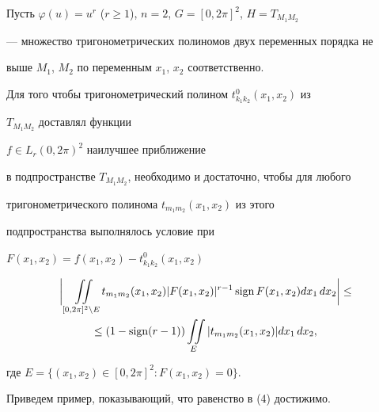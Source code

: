 \begin{note} 


Пусть $\varphi(u)=u^r$ ($r\ge1$), $n=2$, $G=[0,2\pi]^2$, $H=T_{M_1M_2}$ 


--- множество тригонометрических полиномов двух переменных порядка не 


выше $M_1$, $M_2$ по переменным $x_1$, $x_2$ соответственно. 


 


Для того чтобы тригонометрический полином $t^0_{k_1k_2}(x_1,x_2)$ из 


$T_{M_1M_2}$ доставлял функции\linebreak


$f\in L_r(0,2\pi)^2$ наилучшее приближение 


в подпространстве $T_{M_1M_2}$, необходимо и достаточно, чтобы для любого 


тригонометрического полинома $t_{m_1m_2}(x_1,x_2)$ из этого 


подпространства выполнялось условие при 


$F(x_1,x_2)=f(x_1,x_2)-t^0_{k_1k_2}(x_1,x_2)$ 


\begin{multline*} 


\bigg|\;\iint\limits_{[0,2\pi]^2\setminus E}t_{m_1m_2}(x_1,x_2) 


|F(x_1,x_2)|^{r-1}\sign F(x_1,x_2)dx_1\,dx_2\bigg|\le \\ 


% 


\le(1-\sign(r-1))\iint\limits_E|t_{m_1m_2}(x_1,x_2)|dx_1\,dx_2, 


\end{multline*} 


где $E=\{(x_1,x_2)\in[0,2\pi]^2:F(x_1,x_2)=0\}$. 


\end{note} 


 


 


\begin{note} 


Приведем пример, показывающий, что равенство в (4) достижимо. 


\end{note} 


 


 


